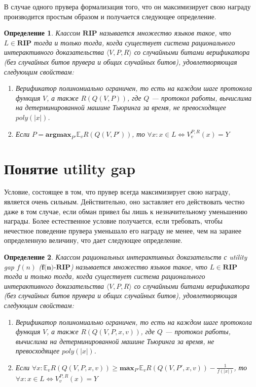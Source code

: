 \documentclass[14pt, a4paper, russian]{report}
\newtheorem{definition}{\indent Определение}
\newcommand{\poly}{\textit{poly}}
\begin{document}
В случае одного прувера формализация того, что он максимизирует свою награду производится простым образом и получается следующее определение.
\begin{definition}\label{rip}
    Классом $\textbf{RIP}$ называется множество языков такое, что $L \in \textbf{RIP}$ тогда и только тогда, когда существует система рационального интерактивного доказательства $\langle V, P, R\rangle$ со случайными битами верификатора (без случайных битов прувера и общих случайных битов), удовлетворяющая следующим свойствам:
    \begin{enumerate}
        \item Верификатор полиномиально ограничен, то есть на каждом шаге протокола функция $V$, а также $R(Q(V, P))$, где $Q$ --- протокол работы, вычислима на детерминированной машине Тьюринга за время, не превосходящее $\poly(|x|)$.
        \item Если $P = \textbf{argmax}_{P'} \mathbb{E}_v R(Q(V, P'))$, то $\forall x: x \in L \iff V^{P, R}_{v}(x) = Y$
        \end{enumerate}
    \end{definition}

    \section{Понятие utility gap}

    Условие, состоящее в том, что прувер всегда максимизирует свою награду, является очень сильным. Действительно, оно заставляет его действовать честно даже в том случае, если обман привел бы лишь к незначительному уменьшению награды. Более естественное условие получается, если требовать, чтобы нечестное поведение прувера уменьшало его награду не менее, чем на заранее определенную величину, что дает следующее определение.

    \begin{definition}
        Классом рациональных интерактивных доказательств с utility gap $f(n)$ ($\textbf{f(n)-RIP}$) называется множество языков такое, что $L \in \textbf{RIP}$ тогда и только тогда, когда существует система рационального интерактивного доказательства $\langle V, P, R\rangle$ со случайными битами верификатора (без случайных битов прувера и общих случайных битов), удовлетворяющая следующим свойствам:
        \begin{enumerate}
            \item Верификатор полиномиально ограничен, то есть на каждом шаге протокола функция $V$, а также $R(Q(V, P, x, v))$, где $Q$ --- протокол работы, вычислима на детерминированной машине Тьюринга за время, не превосходящее $\poly(|x|)$.
            \item Если $\forall x: \mathbb{E}_v R(Q(V, P, x, v)) \geq \textbf{max}_{P'} \mathbb{E}_v R(Q(V, P', x, v)) - \frac{1}{f(|x|)}$, то $\forall x: x \in L \iff V^{P, R}_{v}(x) = Y$
            \end{enumerate}
        \end{definition}
\end{document}
